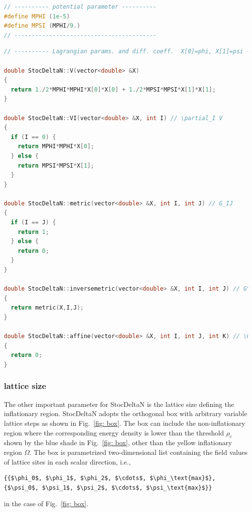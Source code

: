 \documentclass[aps, prd
, preprint
, nofootinbib 
, notitlepage
, superscriptaddress
, longbibliography
]{revtex4-1}
\begin{document}
\begin{lstlisting}[language = C++, caption={\textit{sample/double\_chaotic\_conf.cpp}}, label=list: double_chaotic_conf_lag, firstnumber = 20]
// ---------- potential parameter ----------
#define MPHI (1e-5)
#define MPSI (MPHI/9.)
// -----------------------------------------
\end{lstlisting}

\begin{lstlisting}[language = C++, firstnumber = 93]
// ---------- Lagrangian params. and diff. coeff.  X[0]=phi, X[1]=psi ----------

double StocDeltaN::V(vector<double> &X)
{
  return 1./2*MPHI*MPHI*X[0]*X[0] + 1./2*MPSI*MPSI*X[1]*X[1];
}

double StocDeltaN::VI(vector<double> &X, int I) // \partial_I V
{
  if (I == 0) {
    return MPHI*MPHI*X[0];
  } else {
    return MPSI*MPSI*X[1];
  }
}

double StocDeltaN::metric(vector<double> &X, int I, int J) // G_IJ
{
  if (I == J) {
    return 1;
  } else {
    return 0;
  }
}

double StocDeltaN::inversemetric(vector<double> &X, int I, int J) // G^IJ
{
  return metric(X,I,J);
}

double StocDeltaN::affine(vector<double> &X, int I, int J, int K) // \Gamma^I_JK
{
  return 0;
}
\end{lstlisting}


\subsubsection{lattice size}

The other important parameter for StocDeltaN is the lattice size defining the inflationary region.
StocDeltaN adopts the orthogonal box with arbitrary variable lattice steps as shown in Fig.~\ref{fig: box}.
The box can include the non-inflationary region where the corresponding energy density is lower than the threshold $\rho_c$
shown by the blue shade in Fig.~\ref{fig: box}, other than the yellow inflationary region $\Omega$.
The box is parametrized two-dimensional list containing the field values of lattice sites in each scalar direction, i.e.,
\begin{lstlisting}[numbers = none, mathescape]
{{$\phi_0$, $\phi_1$, $\phi_2$, $\cdots$, $\phi_\text{max}$}, {$\psi_0$, $\psi_1$, $\psi_2$, $\cdots$, $\psi_\text{max}$}}
\end{lstlisting}
in the case of Fig.~\ref{fig: box}.
\end{document}

